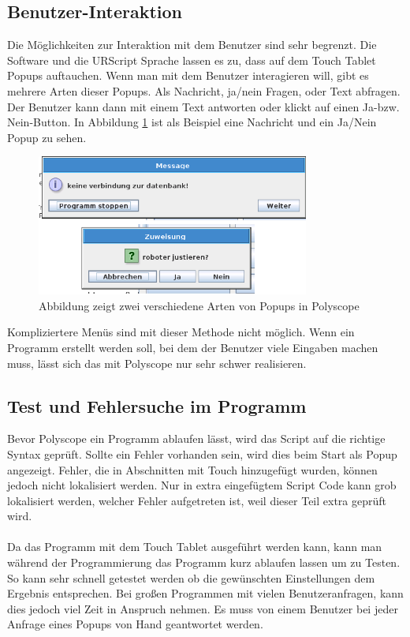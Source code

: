 \subsection{Benutzer-Interaktion}
\label{user_interaktion_polyscope_rel}

Die Möglichkeiten zur Interaktion mit dem Benutzer sind sehr begrenzt. Die Software und die URScript Sprache lassen es zu, dass auf dem Touch Tablet Popups auftauchen. Wenn man mit dem Benutzer interagieren will, gibt es mehrere Arten dieser Popups.
Als Nachricht, ja/nein Fragen, oder Text abfragen. Der Benutzer kann dann mit einem Text antworten oder klickt auf einen Ja-bzw. Nein-Button. In Abbildung \ref{fig:polyscope_popup} ist als Beispiel eine Nachricht und ein Ja/Nein Popup zu sehen.

\begin{figure}[H]
  \centering
    \includegraphics[width=0.8\textwidth]{pic/popup_question.png}
      \caption[Popup in Polyscope]{Abbildung zeigt zwei verschiedene Arten von Popups in Polyscope}
      \label{fig:polyscope_popup}
\end{figure}

Kompliziertere Menüs sind mit dieser Methode nicht möglich. Wenn ein Programm erstellt werden soll, bei dem der Benutzer viele Eingaben machen muss, lässt sich das mit Polyscope nur sehr schwer realisieren.

\subsection{Test und Fehlersuche im Programm}
\label{debuggin_polyscope_rel}

Bevor Polyscope ein Programm ablaufen lässt, wird das Script auf die richtige Syntax geprüft. Sollte ein Fehler vorhanden sein, wird dies beim Start als Popup angezeigt. Fehler, die in Abschnitten mit Touch hinzugefügt wurden, können jedoch nicht lokalisiert werden. Nur in extra eingefügtem Script Code kann grob lokalisiert werden, welcher Fehler aufgetreten ist, weil dieser Teil extra geprüft wird.
\\\\
Da das Programm mit dem Touch Tablet ausgeführt werden kann, kann man während der Programmierung das Programm kurz ablaufen lassen um zu Testen. So kann sehr schnell getestet werden ob die gewünschten Einstellungen dem Ergebnis entsprechen. Bei großen Programmen mit vielen Benutzeranfragen, kann dies jedoch viel Zeit in Anspruch nehmen. Es muss von einem Benutzer bei jeder Anfrage eines Popups von Hand geantwortet werden.

